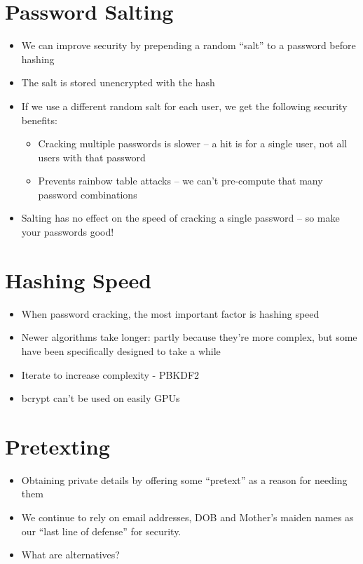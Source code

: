 \documentclass{article}
\begin{document}
\section{Password Salting}
\begin{itemize}
  \item We can improve security by prepending a random “salt” to a password before hashing 
  \item The salt is stored unencrypted with the hash
  \item If we use a different random salt for each user, we get the following security benefits:
  \begin{itemize}
    \item Cracking multiple passwords is slower – a hit is for a single user, not all users with that password
    \item Prevents rainbow table attacks – we can’t pre-compute that many password combinations 
  \end{itemize}
  \item Salting has no effect on the speed of cracking a single password – so make your passwords good!
\end{itemize}

\section{Hashing Speed}
\begin{itemize}
  \item When password cracking, the most important factor is hashing speed 
  \item Newer algorithms take longer: partly because they’re more complex, but some have been specifically designed to take a while 
  \item Iterate to increase complexity - PBKDF2 
  \item bcrypt can’t be used on easily GPUs
\end{itemize}

\section{Pretexting}
\begin{itemize}
  \item Obtaining private details by offering some “pretext” as a reason for needing them 
  \item We continue to rely on email addresses, DOB and Mother’s maiden names as our “last line of defense” for security.
  \item What are alternatives?
\end{itemize}
\end{document}
